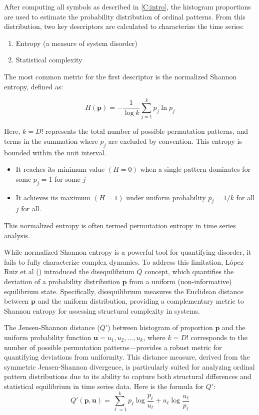 After computing all symbols as described in \ref{C:intro}, the histogram proportions are used to estimate the probability distribution of ordinal patterns. From this distribution, two key descriptors are calculated to characterize the time series:
\begin{enumerate}
\item Entropy (a measure of system disorder)

\item Statistical complexity
\end{enumerate}
The most common metric for the first descriptor is the normalized Shannon entropy, defined as:

\begin{equation}
	H(\mathbf{p})=-\dfrac{1}{\log k}\sum^{k}_{j=1}p_j \ln{p_j}
\end{equation}

Here, $k=D!$ represents the total number of possible permutation patterns, and terms in the summation where $p_j$ are excluded by convention. This entropy is bounded within the unit interval.

\begin{itemize}
\item It reaches its minimum value $(H=0)$ when a single pattern dominates  for some $p_j=1$ for some $j$ 
\item It achieves its maximum $(H=1)$ under uniform probability $p_j=1/k$ for all $j$ for all. 
\end{itemize}

This normalized entropy is often termed permutation entropy in time series analysis. 

While normalized Shannon entropy is a powerful tool for quantifying disorder, it fails to fully characterize complex dynamics. To address this limitation, López-Ruiz et al (\cite{lopez1995statistical}) introduced the disequilibrium $Q$ concept, which quantifies the deviation of a probability distribution $\mathbf{p}$ from a uniform (non-informative) equilibrium state. Specifically, disequilibrium measures the Euclidean distance between $\mathbf{p}$ and the uniform distribution, providing a complementary metric to Shannon entropy for assessing structural complexity in systems.

The Jensen-Shannon distance ($Q'$) between histogram of proportion $\mathbf{p}$ and the uniform probability function $\mathbf{u}=u_1,u_2,\dots, u_k$, where $k=D!$ corresponds to the number of possible permutation patterns—provides a robust metric for quantifying deviations from uniformity. This distance measure, derived from the symmetric Jensen-Shannon divergence, is particularly suited for analyzing ordinal pattern distributions due to its ability to capture both structural differences and statistical equilibrium in time series data.
Here is the formula for $Q'$:
\begin{equation}
	Q'(\mathbf{p,u})=\sum^k_{\ell=1} p_\ell\log\dfrac{p_\ell}{u_\ell}+u_\ell\log\dfrac{u_\ell}{p_\ell}
\end{equation}

